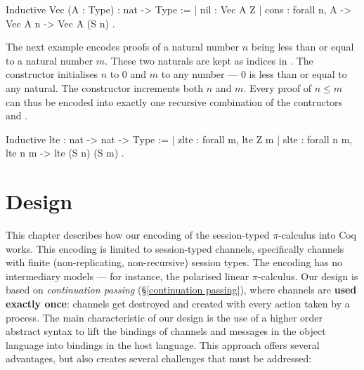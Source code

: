 \documentclass{mproj}
\newcommand{\picalc}{$\pi$-calculus}
\begin{document}
\begin{coq}
    Inductive Vec (A : Type) : nat -> Type :=
    | nil  : Vec A Z
    | cons : forall {n}, A -> Vec A n -> Vec A (S n)
    .
\end{coq}

The next example encodes proofs of a natural number $n$ being less than or equal to a natural number $m$. These two naturals are kept as indices in . The constructor  initialises $n$ to 0 and $m$ to any number --- 0 is less than or equal to any natural. The constructor  increments both $n$ and $m$. Every proof of $n \leq m$ can thus be encoded into exactly one recursive combination of the contructors  and .

\begin{coq}
    Inductive lte : nat -> nat -> Type :=
    | zlte : forall {m}, lte Z m
    | slte : forall {n m}, lte n m -> lte (S n) (S m)
    .
\end{coq}

\chapter{Design}\label{design}

This chapter describes how our encoding of the session-typed \picalc{} into Coq works. This encoding is limited to session-typed channels, specifically channels with finite (non-replicating, non-recursive) session types. The encoding has no intermediary models --- for instance, the polarised linear \picalc{}. Our design is based on \emph{continuation passing} (\S \ref{continuation passing}), where channels are \textbf{used exactly once}: channels get destroyed and created with every action taken by a process.  The main characteristic of our design is the use of a higher order abstract syntax to lift the bindings of channels and messages in the object language into bindings in the host language. This approach offers several advantages, but also creates several challenges that must be addressed:

\end{document}
